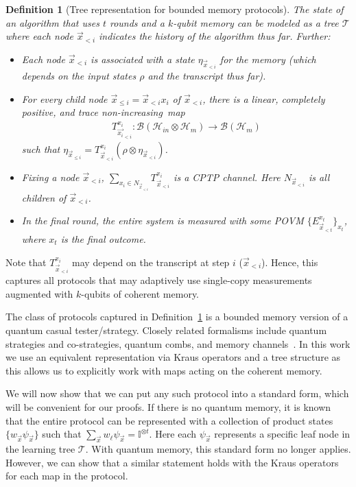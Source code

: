 \documentclass[11pt]{article}
\newtheorem{definition}[theorem]{Definition}
\newcommand{\id}{\ensuremath{\mathbb{I}}}
\begin{document}
\begin{definition}[Tree representation for  bounded memory protocols]\label{def:tree_mem}
The state of an algorithm that uses $t$ rounds and a $k$-qubit memory can be modeled as a tree $\mathcal{T}$ where each node $\vec{x}_{<i}$ indicates the history of the algorithm thus far. Further:

\begin{itemize}
    \item Each node $\vec{x}_{<i}$ is associated with a state $\eta_{\vec{x}_{<i}}$ for the memory (which depends on the input states $\rho$ and the transcript thus far).
    \item For every child node $\vec{x}_{\leq i} = \vec{x}_{<i}x_i$ of $\vec{x}_{<i}$, there is a linear, completely positive, and trace non-increasing~map 
    \begin{align*}
    T^{x_i}_{\vec{x_i}_{<i}}:\mathcal{B}(\mathcal{H}_{in}\otimes \mathcal{H}_m) \rightarrow \mathcal{B}(\mathcal{H}_m)
    \end{align*} 
    such that $\eta_{\vec{x}_{\leq i}} = T^{x_i}_{\vec{x}_{<i}}(\rho\otimes \eta_{\vec{x}_{< i}})$.

    \item Fixing a node $\vec{x}_{<i}$, $\sum_{x_i \in N_{\vec{x}_{<i}}} T_{\vec{x}_{<i}}^{x_i}$ is a CPTP channel. Here $N_{\vec{x}_{<i}}$ is all children of $\vec{x}_{<i}$.

    \item In the final round, the entire system is measured with some POVM $\{E_{\vec{x}_{< t}}^{x_t}\}_{x_t}$, where $x_t$ is the final outcome.
\end{itemize}
\end{definition}
Note that $T^{x_i}_{\vec{x}_{<i}}$ may depend on the transcript at step $i$ ($\vec{x}_{<i}$). Hence, this captures all protocols that may adaptively use single-copy measurements augmented with $k$-qubits of coherent memory.

The class of protocols captured in Definition~\ref{def:tree_mem} is a bounded memory version of a quantum casual tester/strategy. Closely related formalisms include quantum strategies and co-strategies, quantum combs, and memory channels~\cite{chiribella2009theoretical,gutoski2007toward,kretschmann2005quantum}. In this work we use an equivalent representation via Kraus operators and a tree structure as this allows us to explicitly work with maps acting on the coherent memory.

We will now show that we can put any such protocol into a standard form, which will be convenient for our proofs. If there is no quantum memory, it is known that the entire protocol can be represented with a collection of product states $\{w_{\vec{x}} \psi_{\vec{x}}\}$ such that $\sum_{\vec{x}} w_\ell \psi_{\vec{x}} = \id^{\otimes t}$. Here each $\psi_{\vec{x}}$ represents a specific leaf node in the learning tree $\mathcal{T}$. With quantum memory, this standard form no longer applies. However, we can show that a similar statement holds with the Kraus operators for each map in the protocol.
\end{document}
